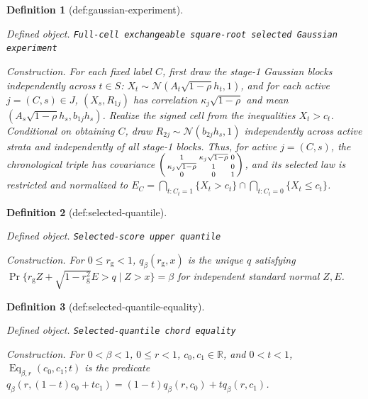 \documentclass{article}
\newtheorem{definition}{Definition}
\begin{document}
\begin{definition}[def:gaussian-experiment]\label{def:gaussian-experiment}
\par\smallskip\noindent\emph{Defined object.} \texttt{Full-\allowbreak{}cell exchangeable square-\allowbreak{}root selected Gaussian experiment}
\par\smallskip\noindent\emph{Construction.} For each fixed label \(C\), first draw the stage-1 Gaussian blocks independently across \(t\in S\): \(X_t\sim\mathcal N(A_t\sqrt{1-\rho}h_t,1)\), and for each active \(j=(C,s)\in J\), \((X_s,R_{1j})\) has correlation \(\kappa_j\sqrt{1-\rho}\) and mean \((A_s\sqrt{1-\rho}h_s,b_{1j}h_s)\). Realize the signed cell from the inequalities \(X_t>c_t\). Conditional on obtaining \(C\), draw \(R_{2j}\sim\mathcal N(b_{2j}h_s,1)\) independently across active strata and independently of all stage-1 blocks. Thus, for active \(j=(C,s)\), the chronological triple has covariance \(\begin{psmallmatrix}1&\kappa_j\sqrt{1-\rho}&0\\\kappa_j\sqrt{1-\rho}&1&0\\0&0&1\end{psmallmatrix}\), and its selected law is restricted and normalized to \(E_C=\bigcap_{t:C_t=1}\{X_t>c_t\}\cap\bigcap_{t:C_t=0}\{X_t\le c_t\}\).
\end{definition}

\begin{definition}[def:selected-quantile]\label{def:selected-quantile}
\par\smallskip\noindent\emph{Defined object.} \texttt{Selected-\allowbreak{}score upper quantile}
\par\smallskip\noindent\emph{Construction.} For \(0\le r_{\mathrm g}<1\), \(q_{\beta}(r_{\mathrm g},x)\) is the unique \(q\) satisfying \(\Pr\{r_{\mathrm g}Z+\sqrt{1-r_{\mathrm g}^2}E>q\mid Z>x\}=\beta\) for independent standard normal \(Z,E\).
\end{definition}

\begin{definition}[def:selected-quantile-equality]\label{def:selected-quantile-equality}
\par\smallskip\noindent\emph{Defined object.} \texttt{Selected-\allowbreak{}quantile chord equality}
\par\smallskip\noindent\emph{Construction.} For \(0<\beta<1\), \(0\le r<1\), \(c_0,c_1\in\mathbb R\), and \(0<t<1\), \(\operatorname{Eq}_{\beta,r}(c_0,c_1;t)\) is the predicate \(q_{\beta}(r,(1-t)c_0+tc_1)=(1-t)q_{\beta}(r,c_0)+tq_{\beta}(r,c_1)\).
\end{definition}
\end{document}
